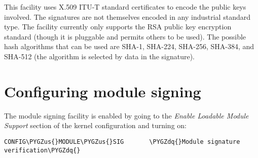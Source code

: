 \documentclass[a4paper,8pt,english]{sphinxmanual}
\def\PYGZus{\char`\_}
\def\PYGZdq{\char`\"}
\begin{document}
This facility uses X.509 ITU-T standard certificates to encode the public keys
involved.  The signatures are not themselves encoded in any industrial standard
type.  The facility currently only supports the RSA public key encryption
standard (though it is pluggable and permits others to be used).  The possible
hash algorithms that can be used are SHA-1, SHA-224, SHA-256, SHA-384, and
SHA-512 (the algorithm is selected by data in the signature).


\section{Configuring module signing}
\label{admin-guide/module-signing:configuring-module-signing}
The module signing facility is enabled by going to the
\emph{Enable Loadable Module Support} section of
the kernel configuration and turning on:

\begin{Verbatim}[commandchars=\\\{\}]
CONFIG\PYGZus{}MODULE\PYGZus{}SIG       \PYGZdq{}Module signature verification\PYGZdq{}
\end{Verbatim}
\end{document}

